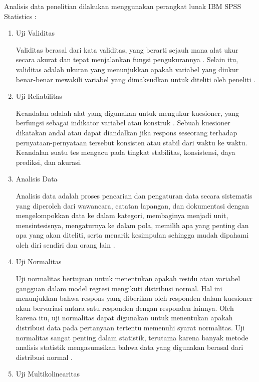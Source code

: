     Analisis data penelitian dilakukan menggunakan perangkat lunak IBM SPSS Statistics :

    \begin{enumerate}
        \item Uji Validitas
        
        Validitas berasal dari kata validitas, yang berarti sejauh mana alat ukur secara akurat dan tepat menjalankan fungsi pengukurannya \citep{Spitz2018}. Selain itu, validitas adalah ukuran yang menunjukkan apakah variabel yang diukur benar-benar mewakili variabel yang dimaksudkan untuk diteliti oleh peneliti \citep{Souza2017}.
        
        \item Uji Reliabilitas
        
        Keandalan adalah alat yang digunakan untuk mengukur kuesioner, yang berfungsi sebagai indikator variabel atau konstruk \citep{Cooper2014}. Sebuah kuesioner dikatakan andal atau dapat diandalkan jika respons seseorang terhadap pernyataan-pernyataan tersebut konsisten atau stabil dari waktu ke waktu. Keandalan suatu tes mengacu pada tingkat stabilitas, konsistensi, daya prediksi, dan akurasi.

        \item Analisis Data

        Analisis data adalah proses pencarian dan pengaturan data secara sistematis yang diperoleh dari wawancara, catatan lapangan, dan dokumentasi dengan mengelompokkan data ke dalam kategori, membaginya menjadi unit, mensintesisnya, mengaturnya ke dalam pola, memilih apa yang penting dan apa yang akan diteliti, serta menarik kesimpulan sehingga mudah dipahami oleh diri sendiri dan orang lain \citep{Schillaci2022}.

        \item Uji Normalitas

        Uji normalitas bertujuan untuk menentukan apakah residu atau variabel gangguan dalam model regresi mengikuti distribusi normal. Hal ini menunjukkan bahwa respons yang diberikan oleh responden dalam kuesioner akan bervariasi antara satu responden dengan responden lainnya. Oleh karena itu, uji normalitas dapat digunakan untuk menentukan apakah distribusi data pada pertanyaan tertentu memenuhi syarat normalitas. Uji normalitas sangat penting dalam statistik, terutama karena banyak metode analisis statistik mengasumsikan bahwa data yang digunakan berasal dari distribusi normal \citep{Bolarinwa2015}.

        \item Uji Multikolinearitas


\end{enumerate}
